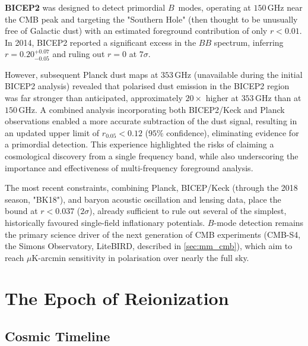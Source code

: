 \begin{observationblock}
\textbf{BICEP2} was designed to detect primordial $B$~modes, operating at $150\,\text{GHz}$ near the CMB peak and targeting the "Southern Hole" (then thought to be unusually free of Galactic dust) with an estimated foreground contribution of only $r < 0.01$. In 2014, BICEP2 reported a significant excess in the $BB$ spectrum, inferring $r = 0.20^{+0.07}_{-0.05}$ and ruling out $r=0$ at $7\sigma$.

\smallskip

However, subsequent Planck dust maps at $353\,\text{GHz}$ (unavailable during the initial BICEP2 analysis) revealed that polarised dust emission in the BICEP2 region was far stronger than anticipated, approximately $20\times$ higher at $353\,\text{GHz}$ than at $150\,\text{GHz}$. A combined analysis incorporating both BICEP2/Keck and Planck observations enabled a more accurate subtraction of the dust signal, resulting in an updated upper limit of $r_{0.05} < 0.12$ ($95\%$ confidence), eliminating evidence for a primordial detection. This experience highlighted the risks of claiming a cosmological discovery from a single frequency band, while also underscoring the importance and effectiveness of multi-frequency foreground analysis.
\end{observationblock}

The most recent constraints, combining Planck, BICEP/Keck (through the 2018 season, "BK18"), and baryon acoustic oscillation and lensing data, place the bound at $r < 0.037$ ($2\sigma$), already sufficient to rule out several of the simplest, historically favoured single-field inflationary potentials. $B$-mode detection remains the primary science driver of the next generation of CMB experiments (CMB-S4, the Simons Observatory, LiteBIRD, described in \cref{sec:mm_cmb}), which aim to reach $\mu\text{K}$-arcmin sensitivity in polarisation over nearly the full sky.

\section{The Epoch of Reionization} \label{sec:reionization}

\subsection{Cosmic Timeline} \label{subsec:reionization_timeline}

